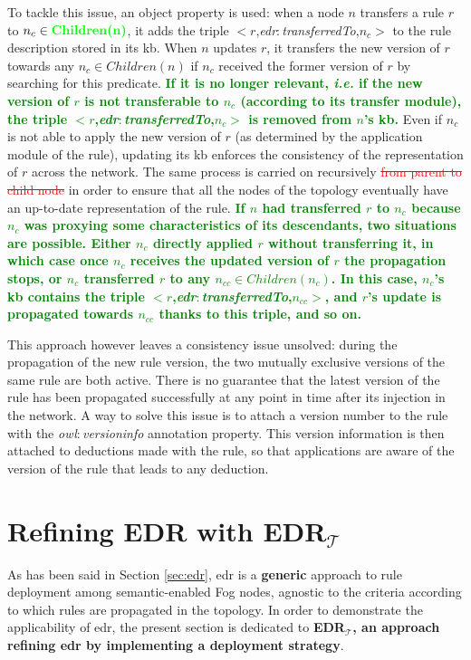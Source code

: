 \documentclass{iosart2c}
\newcommand{\edrt}{EDR$_{\mathcal{T}}$\xspace}
\newcommand{\added}[1]{\textcolor{green}{\textbf{#1}}}
\newcommand{\removed}[1]{\textcolor{red}{\sout{#1}}}
\newcommand{\namespace}[1]{\textit{#1$:$}}
\newcommand{\concept}[2]{\namespace{#1}\-\textit{#2}}
\newcommand{\triplet}[3]{$<$#1,\textit{#2},#3$>$}
\begin{document}
To tackle this issue, an object property is used: when a node $n$ transfers a rule $r$ to $n_{c}\in \added{Children(n)}$, it adds the triple \triplet{$r$}{\concept{edr}{transferred\-To}}{$n_{c}$} to the rule description stored in its \gls{kb}.
When $n$ updates $r$, it transfers the new version of $r$ towards any $n_c \in Children(n)$ if $n_c$ received the former version of $r$ by searching for this predicate. 
\added{If it is no longer relevant, \textit{i.e.} if the new version of $r$ is not transferable to $n_c$ (according to its transfer module), the triple \triplet{$r$}{\concept{edr}{transferred\-To}}{$n_{c}$} is removed from $n$'s \gls{kb}.}
Even if $n_c$ is not able to apply the new version of $r$ (as determined by the application module of the rule), updating its \gls{kb} enforces the consistency of the representation of $r$ across the network. 
The same process is carried on recursively \removed{from parent to child node} in order to ensure that all the nodes of the topology eventually have an up-to-date representation of the rule.
\added{If $n$ had transferred $r$ to $n_c$ because $n_c$ was proxying some characteristics of its descendants, two situations are possible. 
Either $n_c$ directly applied $r$ without transferring it, in which case once $n_c$ receives the updated version of $r$ the propagation stops, or $n_c$ transferred $r$ to any $n_{cc}\in Children(n_c)$.
In this case, $n_c$'s \gls{kb} contains the triple \triplet{$r$}{\concept{edr}{transferred\-To}}{$n_{cc}$}, and $r$'s update is propagated towards $n_{cc}$ thanks to this triple, and so on.}

This approach however leaves a consistency issue unsolved: during the propagation of the new rule version, the two mutually exclusive versions of the same rule are both active. 
There is no guarantee that the latest version of the rule has been propagated successfully at any point in time after its injection in the network.
A way to solve this issue is to attach a version number to the rule with the \concept{owl}{version\-info} annotation property.
This version information is then attached to deductions made with the rule, so that applications are aware of the version of the rule that leads to any deduction.

\section{Refining EDR with \edrt}
\label{sec:edrpt}

As has been said in Section \textsection \ref{sec:edr}, \gls{edr} is a \textbf{generic} approach to rule deployment among semantic-enabled Fog nodes, agnostic to the criteria according to which rules are propagated in the topology.
In order to demonstrate the applicability of \gls{edr}, the present section is dedicated to \textbf{\edrt, an approach refining \gls{edr} by implementing a deployment strategy}.
\end{document}
